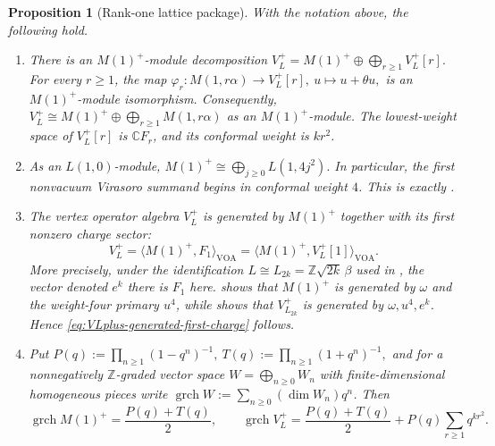 \documentclass[10pt,a4paper]{amsart}
\numberwithin{equation}{section} \newtheorem{thm}{Theorem}[section] \newtheorem{lem}[thm]{Lemma} \newtheorem{ex}[thm]{Example} \newtheorem{prop}[thm]{Proposition} \newtheorem{cor}[thm]{Corollary} \newtheorem{defi}[thm]{Definition} \newtheorem{rmk}[thm]{Remark} \newtheorem{notation}[thm]{Notation}
\newcommand{\grch}{\operatorname{grch}}
\def\Z{\mathbb{Z}} \def\N{\mathbb{N}} \def\A{\mathbb{A}} \def\C{\mathbb{C}} \def\R{\mathbb{R}} \def\Q{\mathbb{Q}} \def\F{\mathbb{F}}
\begin{document}
\begin{prop}[Rank-one lattice package]\label{prop:rank-one-lattice-package}
With the notation above, the following hold.
\begin{enumerate}[label=\textnormal{(\roman*)}]
\item There is an $M(1)^+$-module decomposition
\(V_L^+=M(1)^+\oplus\bigoplus_{r\ge1}V_L^+[r].\) For every $r\ge1$, the map \(\varphi_r:M(1,r\alpha)\longrightarrow V_L^+[r],\ u\longmapsto u+\theta u,\) is an $M(1)^+$-module isomorphism. Consequently, \(V_L^+\cong M(1)^+\oplus\bigoplus_{r\ge1}M(1,r\alpha)\) as an $M(1)^+$-module. The lowest-weight space of $V_L^+[r]$ is $\C F_r$, and its conformal weight is $kr^2$.

\item As an $L(1,0)$-module,
\(M(1)^+\cong\bigoplus_{j\ge0}L(1,4j^2).\) In particular, the first nonvacuum Virasoro summand begins in conformal weight $4$. This is exactly \cite[Theorem~2.7(1)]{DG98}.

\item The vertex operator algebra $V_L^+$ is generated by $M(1)^+$ together
with its first nonzero charge sector:
\begin{equation}\label{eq:VLplus-generated-first-charge}
V_L^+=\langle M(1)^+,F_1\rangle_{\mathrm{VOA}}
     =\langle M(1)^+,V_L^+[1]\rangle_{\mathrm{VOA}}.
\end{equation}
More precisely, under the identification $L\cong L_{2k}=\Z\sqrt{2k}\,\beta$ used in \cite[Section~2]{DG98}, the vector denoted $e^k$ there is $F_1$ here. \cite[Theorem~2.7(2)]{DG98} shows that $M(1)^+$ is generated by $\omega$ and the weight-four primary $u^4$, while \cite[Theorem~2.9]{DG98} shows that $V_{L_{2k}}^+$ is generated by $\omega,u^4,e^k$. Hence \eqref{eq:VLplus-generated-first-charge} follows.

\item Put
\(P(q):=\prod_{n\ge1}(1-q^n)^{-1},\ T(q):=\prod_{n\ge1}(1+q^n)^{-1},\) and for a nonnegatively $\Z$-graded vector space $W=\bigoplus_{n\ge0}W_n$ with finite-dimensional homogeneous pieces write $\grch W:=\sum_{n\ge0}(\dim W_n)q^n$. Then
\begin{equation}\label{eq:rank-one-character-interface}
\grch M(1)^+=\frac{P(q)+T(q)}2,
\qquad
\grch V_L^+
=\frac{P(q)+T(q)}2+P(q)\sum_{r\ge1}q^{kr^2}.
\end{equation}


\end{enumerate}
\end{prop}
\end{document}
